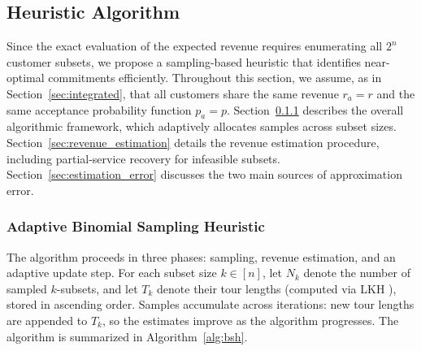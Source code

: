 \documentclass[11pt]{article}
\theoremstyle{plain}
\theoremstyle{definition}
\begin{document}
	\subsection{Heuristic Algorithm}\label{sec:heuristic}
		
	Since the exact evaluation of the expected revenue requires enumerating all $2^n$ customer subsets, we propose a sampling-based heuristic that identifies near-optimal commitments efficiently. Throughout this section, we assume, as in Section~\ref{sec:integrated}, that all customers share the same revenue $r_a = r$ and the same acceptance probability function $p_a = p$.
	Section~\ref{sec:bsh} describes the overall algorithmic framework, which adaptively allocates samples across subset sizes.
	Section~\ref{sec:revenue_estimation} details the revenue estimation procedure, including partial-service recovery for infeasible subsets.
	Section~\ref{sec:estimation_error} discusses the two main sources of approximation error.
	\subsubsection{Adaptive Binomial Sampling Heuristic}\label{sec:bsh}
	
	The algorithm proceeds in three phases: sampling, revenue estimation, and an adaptive update step.
	For each subset size $k \in [n]$, let $N_k$ denote the number of sampled $k$-subsets, and let $T_k$ denote their tour lengths (computed via \ac{LKH} \citep{lin1973effective}), stored in ascending order.
	Samples accumulate across iterations: new tour lengths are appended to $T_k$, so the estimates improve as the algorithm progresses.
	The algorithm is summarized in Algorithm~\ref{alg:bsh}.
	
\end{document}
